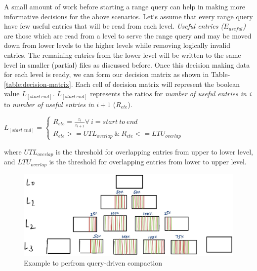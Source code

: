 A small amount of work before starting a range query can help in making more informative decisions for the above 
scenarios. Let`s assume that every range query have few useful entries that will be read from each level. 
\textit{Useful entries ($E_{useful}$)} are those which are read from a level to serve the range query and may be moved 
down from lower levels to the higher levels while removing logically invalid entries. The remaining entries
from the lower level will be written to the same level in smaller (partial) files as discussed before. 
Once this decision making data for each level is ready, we can form our decision matrix as shown in Table-\ref{table:decision-matrix}. 
Each cell of decision matrix will represent the boolean value $L_{[start\ end]}$. $L_{[start\ end]}$ represents the ratio\(s\) for \textit{number of useful entries 
in i} to \textit{number of useful entries in $i+1$} ($R_{ete}$).
\hfill
\begin{center}
\begin{math}
    L_{[start\ end]}=\left\{
      \begin{array}{ll}
        R_{ete} = \frac{z_{i}}{z_{i+1}} \forall\ i=start\ to\ end\\
        R_{ete} >= UTL_{overlap}\ \&\ R_{ete} <= LTU_{overlap}
      \end{array}
    \right.
  \end{math}
\end{center}
\hfill \break
where \textit{$UTL_{overlap}$} is the threshold for overlapping entries from upper to lower level, and \textit{$LTU_{overlap}$} 
is the threshold for overlapping entries from lower to upper level.

\begin{figure}
    \includegraphics[scale=0.2]{Figures/first-state-lsm.jpg}
    \caption{Example to perfrom query-driven compaction}\label{fig:first-state-lsm}
\end{figure}


